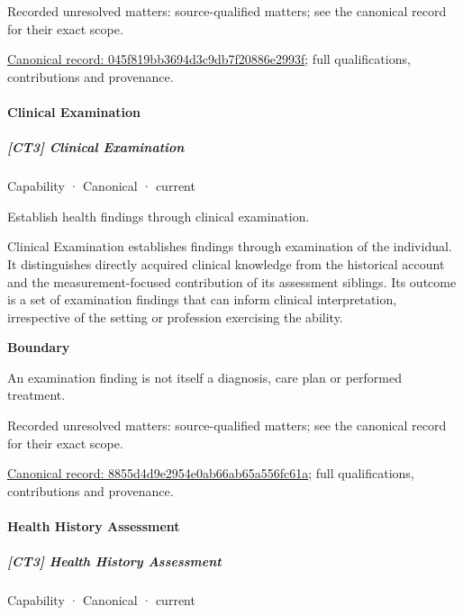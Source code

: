 {\small Recorded unresolved matters: source-qualified matters; see the canonical record for their exact scope.}\par
{\footnotesize \href{../../../../continuum/strategy/capability/045f819bb3694d3c9db7f20886e2993f.md}{Canonical record: 045f819bb3694d3c9db7f20886e2993f}; full qualifications, contributions and provenance.}\par
\paragraph{Clinical Examination}

\subparagraph{[CT3] Clinical Examination}

\label{element:8855d4d9e2954e0ab66ab65a556fc61a}
{\small Capability · Canonical · current}\par

Establish health findings through clinical examination.



Clinical Examination establishes findings through examination of the individual. It distinguishes directly acquired clinical knowledge from the historical account and the measurement-focused contribution of its assessment siblings. Its outcome is a set of examination findings that can inform clinical interpretation, irrespective of the setting or profession exercising the ability.



\textbf{Boundary}



An examination finding is not itself a diagnosis, care plan or performed treatment.


{\small Recorded unresolved matters: source-qualified matters; see the canonical record for their exact scope.}\par
{\footnotesize \href{../../../../continuum/strategy/capability/8855d4d9e2954e0ab66ab65a556fc61a.md}{Canonical record: 8855d4d9e2954e0ab66ab65a556fc61a}; full qualifications, contributions and provenance.}\par
\paragraph{Health History Assessment}

\subparagraph{[CT3] Health History Assessment}

\label{element:7ea7e3f74e2940a7934b588a1a038834}
{\small Capability · Canonical · current}\par

